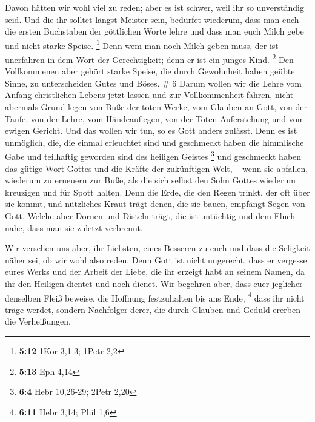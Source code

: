  Davon hätten wir wohl viel zu reden; aber es ist schwer,
weil ihr so unverständig seid.  Und die ihr solltet
längst Meister sein, bedürfet wiederum, dass man euch die ersten
Buchstaben der göttlichen Worte lehre und dass man euch Milch gebe und
nicht starke Speise. \footnote{\textbf{5:12} 1Kor 3,1-3; 1Petr 2,2}
 Denn wem man noch Milch geben muss, der ist unerfahren
in dem Wort der Gerechtigkeit; denn er ist ein junges Kind. \footnote{\textbf{5:13}
  Eph 4,14}  Den Vollkommenen aber gehört starke Speise,
die durch Gewohnheit haben geübte Sinne, zu unterscheiden Gutes und
Böses. \# 6  Darum wollen wir die Lehre vom Anfang
christlichen Lebens jetzt lassen und zur Vollkommenheit fahren, nicht
abermals Grund legen von Buße der toten Werke, vom Glauben an Gott,
 von der Taufe, von der Lehre, vom Händeauflegen, von der
Toten Auferstehung und vom ewigen Gericht.  Und das wollen
wir tun, so es Gott anders zulässt.  Denn es ist
unmöglich, die, die einmal erleuchtet sind und geschmeckt haben die
himmlische Gabe und teilhaftig geworden sind des heiligen Geistes
\footnote{\textbf{6:4} Hebr 10,26-29; 2Petr 2,20}  und
geschmeckt haben das gütige Wort Gottes und die Kräfte der zukünftigen
Welt, --  wenn sie abfallen, wiederum zu erneuern zur
Buße, als die sich selbst den Sohn Gottes wiederum kreuzigen und für
Spott halten.  Denn die Erde, die den Regen trinkt, der
oft über sie kommt, und nützliches Kraut trägt denen, die sie bauen,
empfängt Segen von Gott.  Welche aber Dornen und Disteln
trägt, die ist untüchtig und dem Fluch nahe, dass man sie zuletzt
verbrennt.

 Wir versehen uns aber, ihr Liebsten, eines Besseren zu
euch und dass die Seligkeit näher sei, ob wir wohl also reden.
 Denn Gott ist nicht ungerecht, dass er vergesse eures
Werks und der Arbeit der Liebe, die ihr erzeigt habt an seinem Namen, da
ihr den Heiligen dientet und noch dienet.  Wir begehren
aber, dass euer jeglicher denselben Fleiß beweise, die Hoffnung
festzuhalten bis ans Ende, \footnote{\textbf{6:11} Hebr 3,14; Phil 1,6}
 dass ihr nicht träge werdet, sondern Nachfolger derer,
die durch Glauben und Geduld ererben die Verheißungen.

